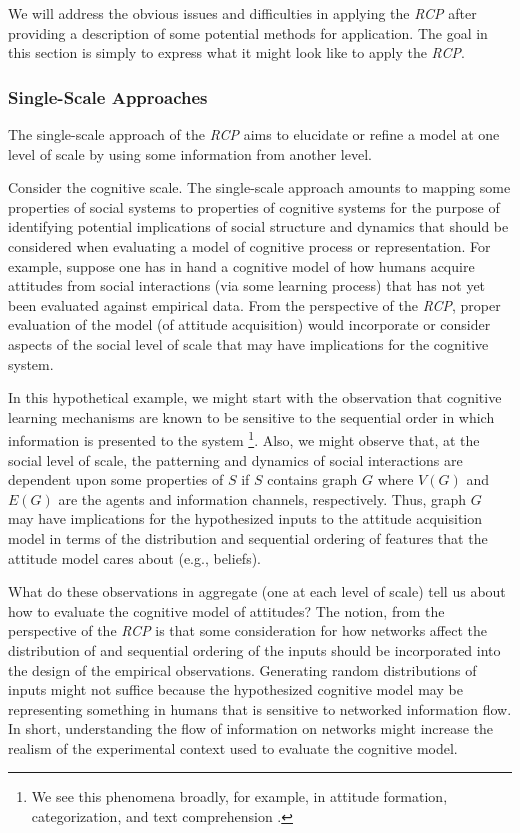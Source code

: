 \documentclass{article}
\begin{document}
We will address the obvious issues and difficulties in applying the \textit{RCP} after providing a description of some potential methods for application.  The goal in this section is simply to express what it might look like to apply the \textit{RCP}.  

\subsubsection{Single-Scale Approaches}
The single-scale approach of the \textit{RCP} aims to elucidate or refine a model at one level of scale by using some information from another level.  

Consider the cognitive scale. The single-scale approach amounts to mapping some properties of social systems to properties of cognitive systems for the purpose of identifying potential implications of social structure and dynamics that should be considered when evaluating a model of cognitive process or representation.  For example, suppose one has in hand a cognitive model of how humans acquire attitudes from social interactions (via some learning process) that has not yet been evaluated against empirical data.  From the perspective of the \textit{RCP}, proper evaluation of the model (of attitude acquisition) would incorporate or consider aspects of the social level of scale that may have implications for the cognitive system.  

In this hypothetical example, we might start with the observation that cognitive learning mechanisms are known to be sensitive to the sequential order in which information is presented to the system \footnote{We see this phenomena broadly, for example,  in attitude formation\cite{cacioppo1992rudimentary}, categorization\cite{heit1994models}, and text comprehension \cite{mcnamara1996learning}.}.   Also, we might observe that, at the social level of scale, the patterning and dynamics of social interactions are dependent upon some properties of $S$ if $S$ contains graph $G$ where $V(G)$ and $E(G)$ are the agents and information channels, respectively. Thus, graph $G$ may have implications for the hypothesized inputs to the attitude acquisition model in terms of the distribution and sequential ordering of features that the attitude model cares about (e.g., beliefs).  

What do these observations in aggregate (one at each level of scale)  tell us about how to evaluate the cognitive model of attitudes?  The notion, from the perspective of the \textit{RCP} is that some consideration for how networks affect the distribution of and sequential ordering of the inputs should be incorporated into the design of the empirical observations.  Generating random distributions of inputs might not suffice because the hypothesized cognitive model may be representing something in humans that is sensitive to networked information flow.  In short, understanding the flow of information on networks might increase the realism of the experimental context used to evaluate the cognitive model. 
\end{document}
